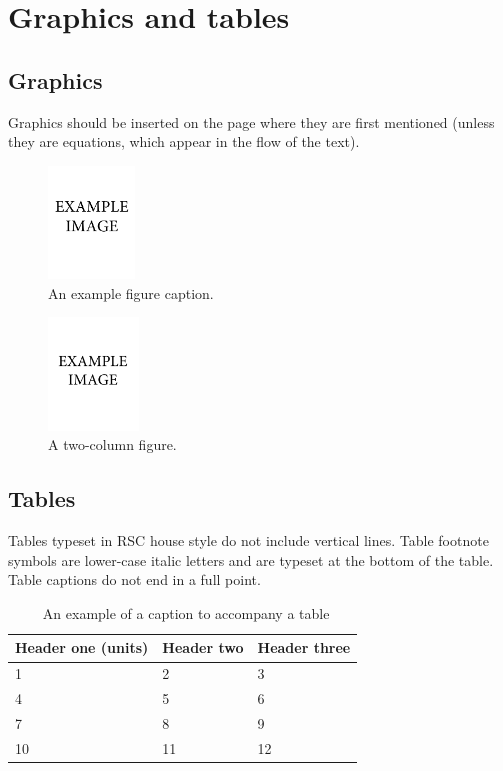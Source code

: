 \documentclass[twoside,twocolumn,9pt]{article}
\begin{document}
\section{Graphics and tables}
\subsection{Graphics}
Graphics should be inserted on the page where they are first mentioned (unless they are equations, which appear in the flow of the text).\cite{Cotton1999}

\begin{figure}[h]
\centering
  \includegraphics[height=3cm]{example1}
  \caption{An example figure caption.}
  \label{fgr:example}
\end{figure}

\begin{figure}
 \centering
 \includegraphics[height=3cm]{example2}
 \caption{A two-column figure.}
 \label{fgr:example2col}
\end{figure}

\subsection{Tables}
Tables typeset in RSC house style do not include vertical lines. Table footnote symbols are lower-case italic letters and are typeset at the bottom of the table. Table captions do not end in a full point.\cite{Arduengo1992,Eisenstein2005}


\begin{table}[h]
\small
  \caption{\ An example of a caption to accompany a table}
  \label{tbl:example1}
  \begin{tabular*}{0.48\textwidth}{@{\extracolsep{\fill}}lll}
    \hline
    Header one (units) & Header two & Header three \\
    \hline
    1 & 2 & 3 \\
    4 & 5 & 6 \\
    7 & 8 & 9 \\
    10 & 11 & 12 \\
    \hline
  \end{tabular*}
\end{table}
\end{document}
